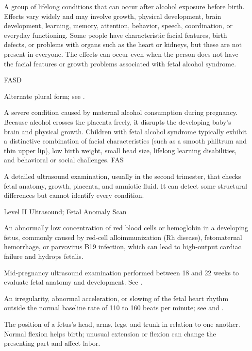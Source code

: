  A group of lifelong conditions that can occur after alcohol exposure before birth. Effects vary widely and may involve growth, physical development, brain development, learning, memory, attention, behavior, speech, coordination, or everyday functioning. Some people have characteristic facial features, birth defects, or problems with organs such as the heart or kidneys, but these are not present in everyone. The effects can occur even when the person does not have the facial features or growth problems associated with fetal alcohol syndrome.

\synonyms
FASD

 Alternate plural form; see .

 A severe condition caused by maternal alcohol consumption during pregnancy. Because alcohol crosses the placenta freely, it disrupts the developing baby's brain and physical growth. Children with fetal alcohol syndrome typically exhibit a distinctive combination of facial characteristics (such as a smooth philtrum and thin upper lip), low birth weight, small head size, lifelong learning disabilities, and behavioral or social challenges.
\synonyms
FAS

 A detailed ultrasound examination, usually in the second trimester, that checks fetal anatomy, growth, placenta, and amniotic fluid. It can detect some structural differences but cannot identify every condition.

\synonyms
Level II Ultrasound; Fetal Anomaly Scan

 An abnormally low concentration of red blood cells or hemoglobin in a developing fetus, commonly caused by red-cell alloimmunization (Rh disease), fetomaternal hemorrhage, or parvovirus B19 infection, which can lead to high-output cardiac failure and hydrops fetalis.

 Mid-pregnancy ultrasound examination performed between 18 and 22 weeks to evaluate fetal anatomy and development. See .

 An irregularity, abnormal acceleration, or slowing of the fetal heart rhythm outside the normal baseline rate of 110 to 160 beats per minute; see  and .

 The position of a fetus’s head, arms, legs, and trunk in relation to one another. Normal flexion helps birth; unusual extension or flexion can change the presenting part and affect labor.

